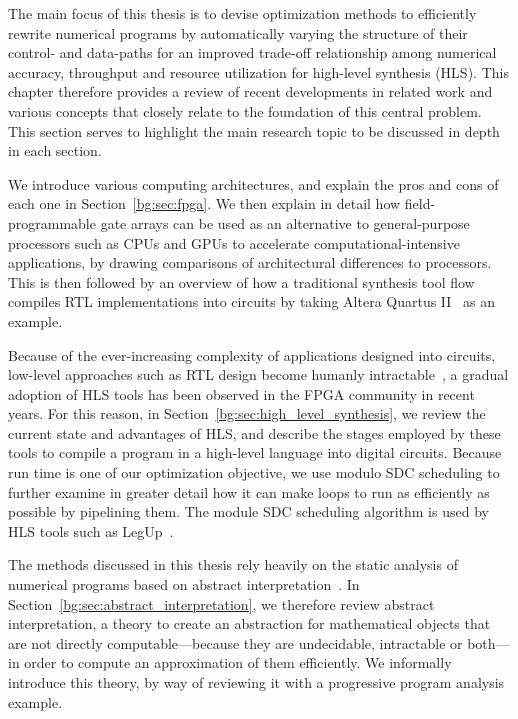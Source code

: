 The main focus of this thesis is to devise optimization methods to efficiently
rewrite numerical programs by automatically varying the structure of their
control- and data-paths for an improved trade-off relationship among numerical
accuracy, throughput and resource utilization for high-level synthesis (HLS).
This chapter therefore provides a review of recent developments in related work
and various concepts that closely relate to the foundation of this central
problem.  This section serves to highlight the main research topic to be
discussed in depth in each section.

We introduce various computing architectures, and explain the pros and cons
of each one in Section~\ref{bg:sec:fpga}.  We then explain in detail how
field-programmable gate arrays can be used as an alternative to general-purpose
processors such as CPUs and GPUs to accelerate computational-intensive
applications, by drawing comparisons of architectural differences to
processors.  This is then followed by an overview of how a traditional
synthesis tool flow compiles RTL implementations into circuits by taking Altera
Quartus II~\cite{quartus} as an example.

Because of the ever-increasing complexity of applications designed
into circuits, low-level approaches such as RTL design become humanly
intractable~\cite{gajski}, a gradual adoption of HLS tools has been
observed in the FPGA community in recent years.  For this reason, in
Section~\ref{bg:sec:high_level_synthesis}, we review the current state and
advantages of HLS, and describe the stages employed by these tools to compile
a program in a high-level language into digital circuits.  Because run time
is one of our optimization objective, we use modulo SDC scheduling to further
examine in greater detail how it can make loops to run as efficiently as
possible by pipelining them.  The module SDC scheduling algorithm is used by
HLS tools such as LegUp~\cite{legup}.

The methods discussed in this thesis rely heavily on the static analysis of
numerical programs based on abstract interpretation~\cite{cousot77}.  In
Section~\ref{bg:sec:abstract_interpretation}, we therefore review abstract
interpretation, a theory to create an abstraction for mathematical objects that
are not directly computable---because they are undecidable, intractable or
both---in order to compute an approximation of them efficiently.  We informally
introduce this theory, by way of reviewing it with a progressive program
analysis example.

